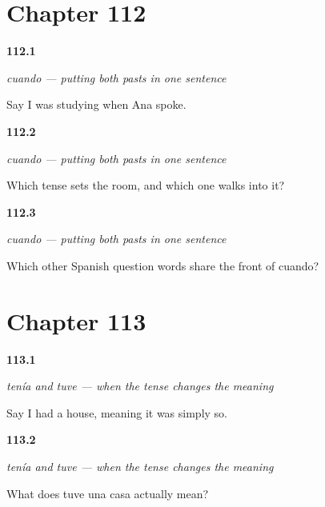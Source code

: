 \section*{Chapter 112}

\noindent\begin{minipage}[t]{\linewidth}
\raggedright
\hypertarget{review-ES-C48-cuando-say}{\textbf{112.1}} \emph{cuando — putting both pasts in one sentence}\par
\small Say I was studying when Ana spoke.
\end{minipage}\par\medskip

\noindent\begin{minipage}[t]{\linewidth}
\raggedright
\hypertarget{review-ES-C48-cuando-which}{\textbf{112.2}} \emph{cuando — putting both pasts in one sentence}\par
\small Which tense sets the room, and which one walks into it?
\end{minipage}\par\medskip

\noindent\begin{minipage}[t]{\linewidth}
\raggedright
\hypertarget{review-ES-C48-cuando-family}{\textbf{112.3}} \emph{cuando — putting both pasts in one sentence}\par
\small Which other Spanish question words share the front of cuando?
\end{minipage}\par\medskip

\section*{Chapter 113}

\noindent\begin{minipage}[t]{\linewidth}
\raggedright
\hypertarget{review-ES-C48-tenia-tuve-had}{\textbf{113.1}} \emph{tenía and tuve — when the tense changes the meaning}\par
\small Say I had a house, meaning it was simply so.
\end{minipage}\par\medskip

\noindent\begin{minipage}[t]{\linewidth}
\raggedright
\hypertarget{review-ES-C48-tenia-tuve-got}{\textbf{113.2}} \emph{tenía and tuve — when the tense changes the meaning}\par
\small What does tuve una casa actually mean?
\end{minipage}\par\medskip

